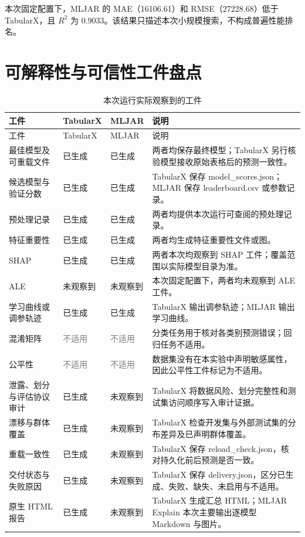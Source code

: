 \documentclass[degree=bachelor,language=chinese,fontset=fandol]{thuthesis}
\newcommand{\yes}{\textcolor{green!50!black}{已生成}}
\newcommand{\no}{\textcolor{red!70!black}{未观察到}}
\newcommand{\na}{\textcolor{gray}{不适用}}
\begin{document}
本次固定配置下，MLJAR 的 MAE（16106.61）和 RMSE（27228.68）低于 TabularX，且 $R^2$ 为 0.9033。该结果只描述本次小规模搜索，不构成普遍性能排名。

\section{可解释性与可信性工件盘点}
\begin{longtable}{>{\raggedright\arraybackslash}p{}>{\centering\arraybackslash}p{}>{\centering\arraybackslash}p{}>{\raggedright\arraybackslash}p{}}
  \caption{本次运行实际观察到的工件}\label{tab:artifacts}\\
  \toprule
  工件 & TabularX & MLJAR & 说明 \\
  \midrule
  \endfirsthead
  \toprule
  工件 & TabularX & MLJAR & 说明 \\
  \midrule
  \endhead
  最佳模型及可重载文件 & \yes & \yes & 两者均保存最终模型；TabularX 另行核验模型接收原始表格后的预测一致性。 \\
  候选模型与验证分数 & \yes & \yes & TabularX 保存 model\_scores.json；MLJAR 保存 leaderboard.csv 或参数记录。 \\
  预处理记录 & \yes & \yes & 两者均提供本次运行可查阅的预处理记录。 \\
  特征重要性 & \yes & \yes & 两者均生成特征重要性文件或图。 \\
  SHAP & \yes & \yes & 两者本次均观察到 SHAP 工件；覆盖范围以实际模型目录为准。 \\
  ALE & \no & \no & 本次固定配置下，两者均未观察到 ALE 工件。 \\
  学习曲线或调参轨迹 & \yes & \yes & TabularX 输出调参轨迹；MLJAR 输出学习曲线。 \\
  混淆矩阵 & \na & \na & 分类任务用于核对各类别预测错误；回归任务不适用。 \\
  公平性 & \na & \na & 数据集没有在本实验中声明敏感属性，因此公平性工件标记为不适用。 \\
  泄露、划分与评估协议审计 & \yes & \no & TabularX 将数据风险、划分完整性和测试集访问顺序写入审计证据。 \\
  漂移与群体覆盖 & \yes & \no & TabularX 检查开发集与外部测试集的分布差异及已声明群体覆盖。 \\
  重载一致性 & \yes & \no & TabularX 保存 reload\_check.json，核对持久化前后预测是否一致。 \\
  交付状态与失败原因 & \yes & \no & TabularX 保存 delivery.json，区分已生成、失败、缺失、未启用与不适用。 \\
  原生 HTML 报告 & \yes & \no & TabularX 生成汇总 HTML；MLJAR Explain 本次主要输出逐模型 Markdown 与图片。 \\
  \bottomrule
\end{longtable}
\end{document}
